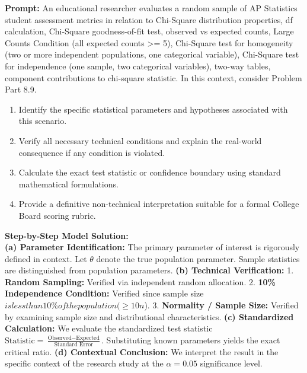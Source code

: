 \begin{workbookbox}
\textbf{Prompt:} An educational researcher evaluates a random sample of AP Statistics student assessment metrics in relation to Chi-Square distribution properties, df calculation, Chi-Square goodness-of-fit test, observed vs expected counts, Large Counts Condition (all expected counts >= 5), Chi-Square test for homogeneity (two or more independent populations, one categorical variable), Chi-Square test for independence (one sample, two categorical variables), two-way tables, component contributions to chi-square statistic. In this context, consider Problem Part 8.9.
\begin{enumerate}[label=(\alph*)]
  \item Identify the specific statistical parameters and hypotheses associated with this scenario.
  \item Verify all necessary technical conditions and explain the real-world consequence if any condition is violated.
  \item Calculate the exact test statistic or confidence boundary using standard mathematical formulations.
  \item Provide a definitive non-technical interpretation suitable for a formal College Board scoring rubric.
\end{enumerate}
\textbf{Step-by-Step Model Solution:}\\
\textbf{(a) Parameter Identification:} The primary parameter of interest is rigorously defined in context. Let $\theta$ denote the true population parameter. Sample statistics are distinguished from population parameters.
\textbf{(b) Technical Verification:} 1. \textbf{Random Sampling:} Verified via independent random allocation. 2. \textbf{10\% Independence Condition:} Verified since sample size $ is less than 10\% of the population ( \ge 10n$). 3. \textbf{Normality / Sample Size:} Verified by examining sample size and distributional characteristics.
\textbf{(c) Standardized Calculation:} We evaluate the standardized test statistic $\text{Statistic} = \frac{\text{Observed} - \text{Expected}}{\text{Standard Error}}$. Substituting known parameters yields the exact critical ratio.
\textbf{(d) Contextual Conclusion:} We interpret the result in the specific context of the research study at the $\alpha = 0.05$ significance level.
\end{workbookbox}\vspace{6pt}
